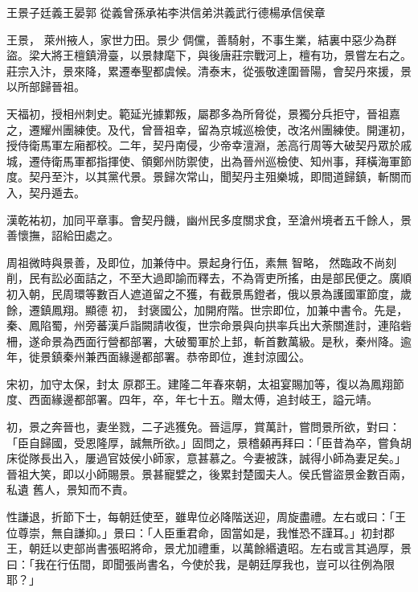 
\begin{pinyinscope}

 王景子廷義王晏郭
 從義曾孫承祐李洪信弟洪義武行德楊承信侯章



 王景，
 萊州掖人，家世力田。景少
 倜儻，善騎射，不事生業，結裏中惡少為群盜。梁大將王檀鎮滑臺，以景隸麾下，與後唐莊宗戰河上，檀有功，景嘗左右之。莊宗入汴，景來降，累遷奉聖都虞候。清泰末，從張敬達圍晉陽，會契丹來援，景以所部歸晉祖。



 天福初，授相州刺史。範延光據鄴叛，屬郡多為所脅從，景獨分兵拒守，晉祖嘉之，遷耀州團練使。及代，曾晉祖幸，留為京城巡檢使，改洺州團練使。開運初，授侍衛馬軍左廂都校。二年，契丹南侵，少帝幸澶淵，恙高行周等大破契丹眾於戚城，遷侍衛馬軍都指揮使、領鄭州防禦使，出為晉州巡檢使、知州事，拜橫海軍節度。契丹至汴，以其黨代景。景歸次常山，聞契丹主殂樂城，即間道歸鎮，斬關而入，契丹遁去。



 漢乾祐初，加同平章事。會契丹饑，幽州民多度關求食，至滄州境者五千餘人，景善懷撫，詔給田處之。



 周祖微時與景善，及即位，加兼侍中。景起身行伍，素無
 智略，
 然臨政不尚刻削，民有訟必面詰之，不至大過即諭而釋去，不為胥吏所搖，由是部民便之。廣順初入朝，民周環等數百人遮道留之不獲，有截景馬鐙者，俄以景為護國軍節度，歲餘，遷鎮鳳翔。顯德
 初，
 封褒國公，加開府階。世宗即位，加兼中書令。先是，秦、鳳陷蜀，州旁蕃漢戶詣闕請收復，世宗命景與向拱率兵出大荼關進討，連陷砦柵，遂命景為西面行營都部署，大破蜀軍於上邽，斬首數萬級。是秋，秦州降。逾年，徙景鎮秦州兼西面緣邊都部署。恭帝即位，進封涼國公。



 宋初，加守太保，封太
 原郡王。建隆二年春來朝，太祖宴賜加等，復以為鳳翔節度、西面緣邊都部署。四年，卒，年七十五。贈太傅，追封岐王，謚元靖。



 初，景之奔晉也，妻坐戮，二子逃獲免。晉這厚，賞萬計，嘗問景所欲，對曰：「臣自歸國，受恩隆厚，誠無所欲。」固問之，景稽顙再拜曰：「臣昔為卒，嘗負胡床從隊長出入，屢過官妓侯小師家，意甚慕之。今妻被誅，誠得小師為妻足矣。」晉祖大笑，即以小師賜景。景甚寵嬖之，後累封楚國夫人。侯氏嘗盜景金數百兩，私遺
 舊人，景知而不責。



 性謙退，折節下士，每朝廷使至，雖卑位必降階送迎，周旋盡禮。左右或曰：「王位尊崇，無自謙抑。」景曰：「人臣重君命，固當如是，我惟恐不謹耳。」初封郡王，朝廷以吏部尚書張昭將命，景尤加禮重，以萬餘緡遺昭。左右或言其過厚，景曰：「我在行伍間，即聞張尚書名，今使於我，是朝廷厚我也，豈可以往例為限耶？」




\end{pinyinscope}
